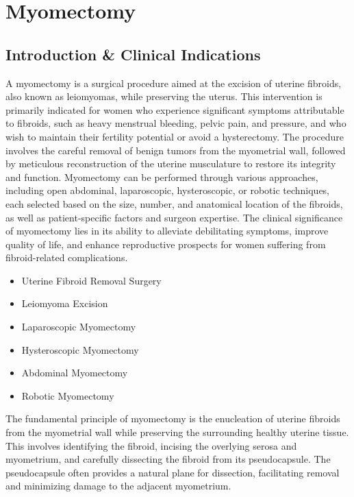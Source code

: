 \chapter{Myomectomy}

\section*{Introduction \& Clinical Indications}
A myomectomy is a surgical procedure aimed at the excision of uterine fibroids, also known as leiomyomas, while preserving the uterus. This intervention is primarily indicated for women who experience significant symptoms attributable to fibroids, such as heavy menstrual bleeding, pelvic pain, and pressure, and who wish to maintain their fertility potential or avoid a hysterectomy. The procedure involves the careful removal of benign tumors from the myometrial wall, followed by meticulous reconstruction of the uterine musculature to restore its integrity and function. Myomectomy can be performed through various approaches, including open abdominal, laparoscopic, hysteroscopic, or robotic techniques, each selected based on the size, number, and anatomical location of the fibroids, as well as patient-specific factors and surgeon expertise. The clinical significance of myomectomy lies in its ability to alleviate debilitating symptoms, improve quality of life, and enhance reproductive prospects for women suffering from fibroid-related complications.

\begin{itemize}
  \item Uterine Fibroid Removal Surgery
  \item Leiomyoma Excision
  \item Laparoscopic Myomectomy
  \item Hysteroscopic Myomectomy
  \item Abdominal Myomectomy
  \item Robotic Myomectomy
\end{itemize}

The fundamental principle of myomectomy is the enucleation of uterine fibroids from the myometrial wall while preserving the surrounding healthy uterine tissue. This involves identifying the fibroid, incising the overlying serosa and myometrium, and carefully dissecting the fibroid from its pseudocapsule. The pseudocapsule often provides a natural plane for dissection, facilitating removal and minimizing damage to the adjacent myometrium. 

